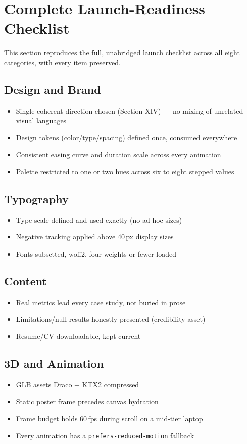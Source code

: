 \documentclass[conference]{IEEEtran}
\begin{document}
\section{Complete Launch-Readiness Checklist}

This section reproduces the full, unabridged launch checklist across all eight categories, with every item preserved.

\subsection{Design and Brand}
\begin{itemize}[leftmargin=*]
\item Single coherent direction chosen (Section XIV) --- no mixing of unrelated visual languages
\item Design tokens (color/type/spacing) defined once, consumed everywhere
\item Consistent easing curve and duration scale across every animation
\item Palette restricted to one or two hues across six to eight stepped values
\end{itemize}

\subsection{Typography}
\begin{itemize}[leftmargin=*]
\item Type scale defined and used exactly (no ad hoc sizes)
\item Negative tracking applied above 40\,px display sizes
\item Fonts subsetted, woff2, four weights or fewer loaded
\end{itemize}

\subsection{Content}
\begin{itemize}[leftmargin=*]
\item Real metrics lead every case study, not buried in prose
\item Limitations/null-results honestly presented (credibility asset)
\item Resume/CV downloadable, kept current
\end{itemize}

\subsection{3D and Animation}
\begin{itemize}[leftmargin=*]
\item GLB assets Draco + KTX2 compressed
\item Static poster frame precedes canvas hydration
\item Frame budget holds 60\,fps during scroll on a mid-tier laptop
\item Every animation has a \texttt{prefers-reduced-motion} fallback
\end{itemize}
\end{document}
